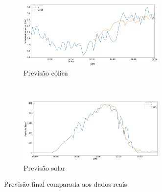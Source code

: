 
\begin{figure}[H]
	\centering
	\begin{subfigure}{\textwidth}
		\centering
		\includegraphics[width=0.8\textwidth]{../img/wind_comp.png}
		\caption{Previsão eólica}\label{fig:wind:comp}
	\end{subfigure}
	\\ \vspace{1cm}
	\begin{subfigure}{\textwidth}
		\centering
		\includegraphics[width=0.8\textwidth]{../img/solar_comp.png}
		\caption{Previsão solar}\label{fig:solar:comp}
	\end{subfigure}
	\caption{Previsão final comparada aos dados reais}\label{fig:comp}
\end{figure}

